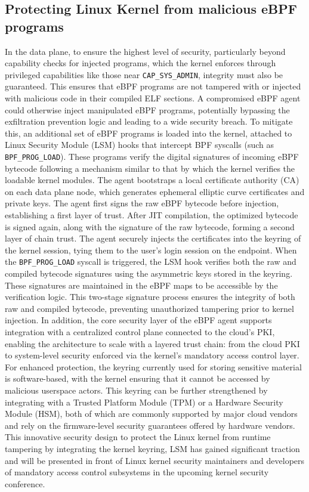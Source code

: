 \documentclass [11pt, proquest] {uwthesis}[2020/02/24]
\begin{document}
\subsection{Protecting Linux Kernel from malicious eBPF programs}
In the data plane, to ensure the highest level of security, particularly beyond capability checks for injected programs, which the kernel enforces through privileged capabilities like those near \texttt{CAP\_SYS\_ADMIN}, integrity must also be guaranteed. This ensures that eBPF programs are not tampered with or injected with malicious code in their compiled ELF sections. A compromised eBPF agent could otherwise inject manipulated eBPF programs, potentially bypassing the exfiltration prevention logic and leading to a wide security breach. To mitigate this, an additional set of eBPF programs is loaded into the kernel, attached to Linux Security Module (LSM) hooks that intercept BPF syscalls (such as \texttt{BPF\_PROG\_LOAD}). These programs verify the digital signatures of incoming eBPF bytecode following a mechanism similar to that by which the kernel verifies the loadable kernel modules. The agent bootstraps a local certificate authority (CA) on each data plane node, which generates ephemeral elliptic curve certificates and private keys. The agent first signs the raw eBPF bytecode before injection, establishing a first layer of trust. After JIT compilation, the optimized bytecode is signed again, along with the signature of the raw bytecode, forming a second layer of chain trust. The agent securely injects the certificates into the keyring of the kernel session, tying them to the user’s login session on the endpoint. When the \texttt{BPF\_PROG\_LOAD} syscall is triggered, the LSM hook verifies both the raw and compiled bytecode signatures using the asymmetric keys stored in the keyring. These signatures are maintained in the eBPF maps to be accessible by the verification logic. This two-stage signature process ensures the integrity of both raw and compiled bytecode, preventing unauthorized tampering prior to kernel injection. In addition, the core security layer of the eBPF agent supports integration with a centralized control plane connected to the cloud’s PKI, enabling the architecture to scale with a layered trust chain: from the cloud PKI to system-level security enforced via the kernel's mandatory access control layer. For enhanced protection, the keyring currently used for storing sensitive material is software-based, with the kernel ensuring that it cannot be accessed by malicious userspace actors. This keyring can be further strengthened by integrating with a Trusted Platform Module (TPM) or a Hardware Security Module (HSM), both of which are commonly supported by major cloud vendors and rely on the firmware-level security guarantees offered by hardware vendors. This innovative security design to protect the Linux kernel from runtime tampering by integrating the kernel keyring, LSM has gained significant traction and will be presented in front of Linux kernel security maintainers and developers of mandatory access control subsystems in the upcoming kernel security conference.
\end{document}
